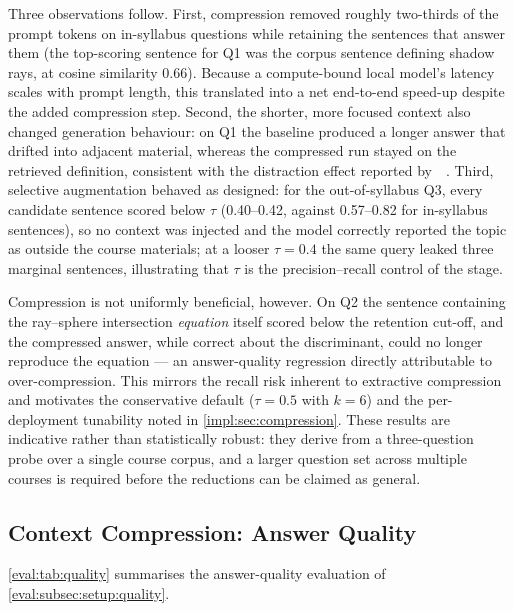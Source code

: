 Three observations follow. First, compression removed roughly two-thirds of the
prompt tokens on in-syllabus questions while retaining the sentences that answer
them (the top-scoring sentence for Q1 was the corpus sentence defining shadow
rays, at cosine similarity 0.66). Because a compute-bound local model's latency
scales with prompt length, this translated into a net end-to-end speed-up
despite the added compression step. Second, the shorter, more focused context
also changed generation behaviour: on Q1 the baseline produced a longer answer
that drifted into adjacent material, whereas the compressed run stayed on the
retrieved definition, consistent with the distraction effect reported
by~\citet{tacl24:Liu}~\cite{tacl24:Liu}. Third, selective augmentation behaved as
designed: for the out-of-syllabus Q3, every candidate sentence scored below
$\tau$ (0.40--0.42, against 0.57--0.82 for in-syllabus sentences), so no context
was injected and the model correctly reported the topic as outside the course
materials; at a looser $\tau = 0.4$ the same query leaked three marginal
sentences, illustrating that $\tau$ is the precision--recall control of the
stage.

Compression is not uniformly beneficial, however. On Q2 the sentence containing
the ray--sphere intersection \emph{equation} itself scored below the retention
cut-off, and the compressed answer, while correct about the discriminant, could
no longer reproduce the equation --- an answer-quality regression directly
attributable to over-compression. This mirrors the recall risk inherent to
extractive compression~\cite{iclr24:Xu} and motivates the conservative default
($\tau = 0.5$ with $k = 6$) and the per-deployment tunability noted in
\autoref{impl:sec:compression}. These results are indicative rather than
statistically robust: they derive from a three-question probe over a single
course corpus, and a larger question set across multiple courses is required
before the reductions can be claimed as general.

\subsection{Context Compression: Answer Quality}
\label{eval:sec:results:quality}

\autoref{eval:tab:quality} summarises the answer-quality evaluation of
\autoref{eval:subsec:setup:quality}.

